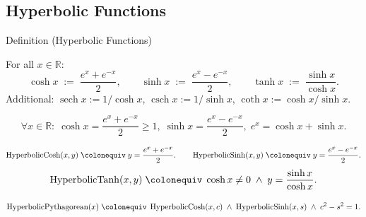 
\subsection*{Hyperbolic Functions}
\label{sec:hyperbolic}

\begin{definitionbox}{Definition (Hyperbolic Functions)}
\begin{definition}
\label{def:hyperbolic}
For all $x \in \mathbb{R}$:
\[
  \cosh x \;:=\; \frac{e^x + e^{-x}}{2},
  \qquad
  \sinh x \;:=\; \frac{e^x - e^{-x}}{2},
  \qquad
  \tanh x \;:=\; \frac{\sinh x}{\cosh x}.
\]
Additional: $\operatorname{sech} x := 1/\cosh x$,\;
$\operatorname{csch} x := 1/\sinh x$,\;
$\coth x := \cosh x / \sinh x$.
\end{definition}
\end{definitionbox}\begin{remark*}
\[
  \forall x \in \mathbb{R} :\;
  \cosh x = \frac{e^x + e^{-x}}{2} \geq 1,\;
  \sinh x = \frac{e^x - e^{-x}}{2},\;
  e^x = \cosh x + \sinh x.
\]
\end{remark*}

\begin{remark*}
\[
  \operatorname{HyperbolicCosh}(x,y)
  \;\colonequiv\;
  y = \frac{e^x + e^{-x}}{2}.
  \qquad
  \operatorname{HyperbolicSinh}(x,y)
  \;\colonequiv\;
  y = \frac{e^x - e^{-x}}{2}.
\]
\[
  \operatorname{HyperbolicTanh}(x,y)
  \;\colonequiv\;
  \cosh x \neq 0 \;\wedge\; y = \frac{\sinh x}{\cosh x}.
\]
\end{remark*}

\begin{remark*}
\[
  \operatorname{HyperbolicPythagorean}(x)
  \;\colonequiv\;
  \operatorname{HyperbolicCosh}(x,c)
  \;\wedge\; \operatorname{HyperbolicSinh}(x,s)
  \;\wedge\; c^2 - s^2 = 1.
\]
\end{remark*}

